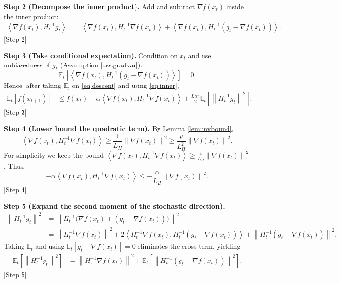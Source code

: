 \documentclass{article}
\newcommand{\E}{\mathbb{E}}
\newcommand{\norm}[1]{\left\lVert #1\right\rVert}
\newcommand{\ip}[2]{\left\langle #1,#2\right\rangle}
\begin{document}
\noindent\textbf{Step 2 (Decompose the inner product).}  
Add and subtract $\nabla f(x_t)$ inside the inner product:
\begin{align}
    \ip{\nabla f(x_t)}{H_t^{-1}g_t}
    &=\ip{\nabla f(x_t)}{H_t^{-1}\nabla f(x_t)}
      +\ip{\nabla f(x_t)}{H_t^{-1}(g_t-\nabla f(x_t))}.
    \tag{4}\label{eq:inner}
\end{align}
[Step 2]

\noindent\textbf{Step 3 (Take conditional expectation).}  
Condition on $x_t$ and use unbiasedness of $g_t$ (Assumption \ref{ass:gradvar}):
\[
    \E_t\!\left[\ip{\nabla f(x_t)}{H_t^{-1}(g_t-\nabla f(x_t))}\right]=0.
\]
Hence, after taking $\E_t$ on \eqref{eq:descent} and using \eqref{eq:inner},
\begin{align}
    \E_t[f(x_{t+1})]
    &\le f(x_t)-\alpha\ip{\nabla f(x_t)}{H_t^{-1}\nabla f(x_t)}
      +\frac{L\alpha^{2}}{2}\E_t\!\left[\norm{H_t^{-1}g_t}^{2}\right].
    \tag{5}\label{eq:expdescent}
\end{align}
[Step 3]

\noindent\textbf{Step 4 (Lower bound the quadratic term).}  
By Lemma \ref{lem:invbound},
\[
    \ip{\nabla f(x_t)}{H_t^{-1}\nabla f(x_t)}
    \ge \frac{1}{L_H}\norm{\nabla f(x_t)}^{2}
    \ge \frac{\mu}{L_H^{2}}\norm{\nabla f(x_t)}^{2}.
\]
For simplicity we keep the bound $\ip{\nabla f(x_t)}{H_t^{-1}\nabla f(x_t)}\ge \frac{1}{L_H}\norm{\nabla f(x_t)}^{2}$.  
Thus,
\[
    -\alpha\ip{\nabla f(x_t)}{H_t^{-1}\nabla f(x_t)}
    \le -\frac{\alpha}{L_H}\norm{\nabla f(x_t)}^{2}.
\]
[Step 4]

\noindent\textbf{Step 5 (Expand the second moment of the stochastic direction).}
\begin{align}
    \norm{H_t^{-1}g_t}^{2}
    &=\norm{H_t^{-1}\big(\nabla f(x_t)+(g_t-\nabla f(x_t))\big)}^{2}\nonumber\\
    &=\norm{H_t^{-1}\nabla f(x_t)}^{2}
      +2\ip{H_t^{-1}\nabla f(x_t)}{H_t^{-1}(g_t-\nabla f(x_t))}
      +\norm{H_t^{-1}(g_t-\nabla f(x_t))}^{2}.
\end{align}
Taking $\E_t$ and using $\E_t[g_t-\nabla f(x_t)]=0$ eliminates the cross term, yielding
\begin{align}
    \E_t\!\left[\norm{H_t^{-1}g_t}^{2}\right]
    &=\norm{H_t^{-1}\nabla f(x_t)}^{2}
      +\E_t\!\left[\norm{H_t^{-1}(g_t-\nabla f(x_t))}^{2}\right].
    \tag{6}\label{eq:secondmoment}
\end{align}
[Step 5]
\end{document}
